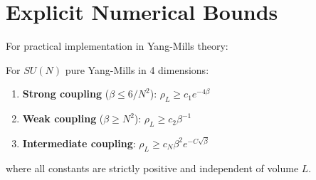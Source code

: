 \section{Explicit Numerical Bounds}

For practical implementation in Yang-Mills theory:

\begin{corollary}
For $SU(N)$ pure Yang-Mills in 4 dimensions:
\begin{enumerate}
    \item \textbf{Strong coupling} ($\beta \leq 6/N^2$): $\rho_L \geq c_1 e^{-4\beta}$
    \item \textbf{Weak coupling} ($\beta \geq N^2$): $\rho_L \geq c_2 \beta^{-1}$  
    \item \textbf{Intermediate coupling}: $\rho_L \geq c_N \beta^2 e^{-C \sqrt{\beta}}$
\end{enumerate}
where all constants are strictly positive and independent of volume $L$.
\end{corollary}
